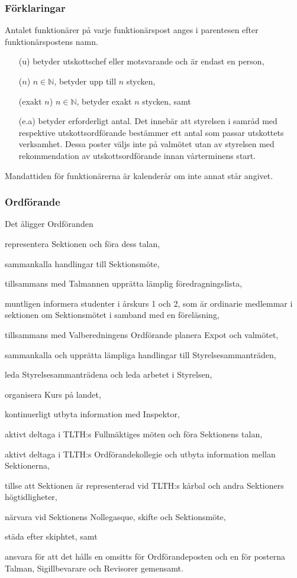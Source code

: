 \documentclass[10pt]{article}
\begin{document}
\subsubsection{Förklaringar}
Antalet funktionärer på varje funktionärspost anges i parentesen efter funktionärspostens namn.
\begin{itemize}
    \item[(u)] betyder utskottschef eller motsvarande och är endast en person,
    \item[($n$)] $n \in \mathbb{N}$, betyder upp till $n$ stycken,
    \item[(exakt $n$)] $n \in \mathbb{N}$, betyder exakt $n$ stycken, samt
    \item[(e.a)] betyder erforderligt antal. Det innebär att styrelsen i samråd med respektive utskottsordförande bestämmer ett antal som passar utskottets verksamhet. Dessa poster väljs inte på valmötet utan av styrelsen med rekommendation av utskottsordförande innan vårterminens start.
\end{itemize}
Mandattiden för funktionärerna är kalenderår om inte annat står angivet.

\subsubsection{Ordförande}
Det åligger Ordföranden
\begin{attlist}
    \item representera Sektionen och föra dess talan,
    \item sammankalla handlingar till Sektionsmöte,
    \item tillsammans med Talmannen upprätta lämplig föredragningslista,
    \item muntligen informera studenter i årskurs 1 och 2, som är ordinarie medlemmar i sektionen om Sektionsmötet i samband med en föreläsning,
    \item tillsammans med Valberedningens Ordförande planera Expot och valmötet,
    \item sammankalla och upprätta lämpliga handlingar till Styrelsesammanträden,
    \item leda Styrelsesammanträdena och leda arbetet i Styrelsen,
    \item organisera Kurs på landet,
    \item kontinuerligt utbyta information med Inspektor,
    \item aktivt deltaga i TLTH:s Fullmäktiges möten och föra Sektionens talan,
    \item aktivt deltaga i TLTH:s Ordförandekollegie och utbyta information mellan Sektionerna,
    \item tillse att Sektionen är representerad vid TLTH:s kårbal och andra Sektioners högtidligheter,
    \item närvara vid Sektionens Nollegasque, skifte och Sektionsmöte,
    \item städa efter skiphtet, samt
    \item ansvara för att det hålls en omsitts för Ordförandeposten och en för posterna Talman, Sigillbevarare och Revisorer gemensamt.
\end{attlist}
\end{document}
